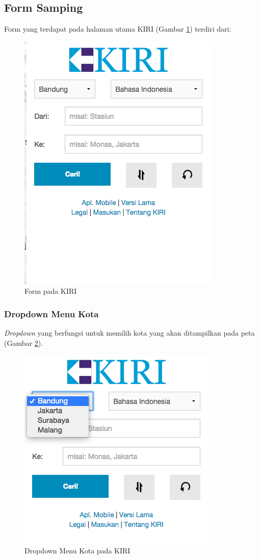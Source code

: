 \subsection{Form Samping}
Form yang terdapat pada halaman utama KIRI (Gambar \ref{fig:3_KIRI_form}) terdiri dari:
\begin{figure}[H]
	\centering
	\includegraphics[scale=0.5]{Gambar/KIRI-form}
	\caption{Form pada KIRI} 
	\label{fig:3_KIRI_form}
\end{figure}

\subsubsection{Dropdown Menu Kota}
\textit{Dropdown} yang berfungsi untuk memilih kota yang akan ditampilkan pada peta (Gambar \ref{fig:3_KIRI_drop_kota}).

\begin{figure}[H]
	\centering
	\includegraphics[scale=0.5]{Gambar/KIRI-drop-kota}
	\caption{Dropdown Menu Kota pada KIRI} 
	\label{fig:3_KIRI_drop_kota}
\end{figure}

